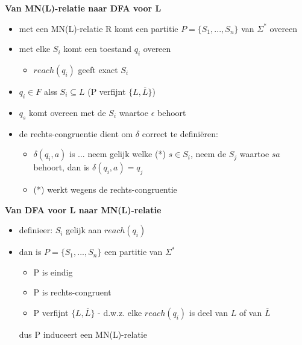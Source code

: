 \documentclass{seminar}
\newcommand{\openpagina}{}
\begin{document}
\begin{slide}
{\bf Van MN(L)-relatie naar DFA voor L}

\begin{itemize}
\item met een MN(L)-relatie R komt een partitie $P = \{S_1,...,S_n\}$ van
$\Sigma^*$ overeen
\item met elke $S_i$ komt een toestand $q_i$ overeen
\begin{itemize}
\item[] {\footnotesize $reach(q_i)$ geeft exact $S_i$}
\end{itemize}
\item $q_i \in F$ alss $S_i \subseteq L$ (P verfijnt $\{L,\overline{L}\}$)
\item $q_s$ komt overeen met de $S_i$ waartoe $\epsilon$ behoort

\item de rechts-congruentie dient om $\delta$ correct te defini\"eren:
\begin{itemize}
\item[] $\delta(q_i,a)$ is ... neem gelijk welke (*) $s \in S_i$, neem de
$S_j$ waartoe $sa$ behoort, dan is $\delta(q_i,a) = q_j$
\item[] (*) werkt wegens de rechts-congruentie
\end{itemize}

\end{itemize}



\end{slide} \openpagina

\begin{slide}
{\bf Van DFA voor L naar MN(L)-relatie}

\begin{itemize}
\item definieer: $S_i$ gelijk aan $reach(q_i)$
\item dan is $P = \{S_1,...,S_n\}$ een partitie van $\Sigma^*$
\begin{itemize}
\item P is eindig
\item P is rechts-congruent
\item P verfijnt $\{L,\overline{L}\}$ - d.w.z. elke $reach(q_i)$ is deel
van $L$ of van $\overline{L}$
\end{itemize}
dus P induceert een MN(L)-relatie
\end{itemize}

\end{slide} \openpagina
\end{document}
